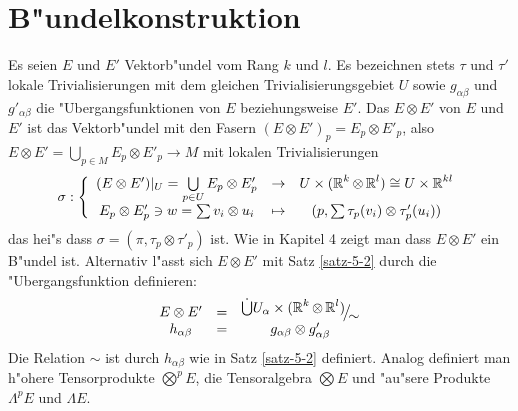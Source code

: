 \section{B"undelkonstruktion}
Es seien $E$ und $E'$ Vektorb"undel vom Rang $k$ und $l$. Es bezeichnen stets $\tau$ und $\tau'$ lokale Trivialisierungen mit dem gleichen Trivialisierungsgebiet $U$ sowie $g_{\alpha\beta}$ und $g'_{\alpha\beta}$ die "Ubergangsfunktionen von $E$ beziehungsweise $E'$. Das  $E \otimes E'$ von $E$ und $E'$ ist das Vektorb"undel mit den Fasern $(E \otimes E')_p = E_p \otimes E'_p$, also $E \otimes E' = \bigcup_{p \in M} E_p \otimes E'_p \to M$ mit lokalen Trivialisierungen
	\[ \sigma: \left\{\begin{array}{ccc} (E \otimes E')|_U = \bigcup\limits_{p \in U} E_p \otimes E'_p &\to& U \times (\operatorname{\mathbb{R}}^k \otimes \operatorname{\mathbb{R}}^l) \cong U \times \operatorname{\mathbb{R}}^{kl} \\
		E_p \otimes E'_p \ni w = \sum v_i \otimes u_i &\mapsto& (p, \sum \tau_p(v_i) \otimes \tau'_p(u_i)) \end{array}\right. \]
das hei"s dass $\sigma = (\pi, \tau_p \otimes \tau'_p)$ ist. Wie in Kapitel 4 zeigt man dass $E \otimes E'$ ein B"undel ist. Alternativ l"asst sich $E \otimes E'$ mit Satz \ref{satz-5-2} durch die "Ubergangsfunktion definieren:
	\[\begin{array}{ccc} E \otimes E' &=& \FakRaum{\dot \bigcup U_{\alpha} \X (\R^k \otimes \R^l)}{\sim} \\
		h_{\alpha\beta} &=& g_{\alpha\beta} \otimes g'_{\alpha\beta} \end{array}\]
Die Relation $\sim$ ist durch $h_{\alpha\beta}$ wie in Satz \ref{satz-5-2} definiert. Analog definiert man h"ohere Tensorprodukte $\bigotimes^pE$, die Tensoralgebra $\bigotimes E$ und "au"sere Produkte $\Lambda^pE$ und $\Lambda E$.

